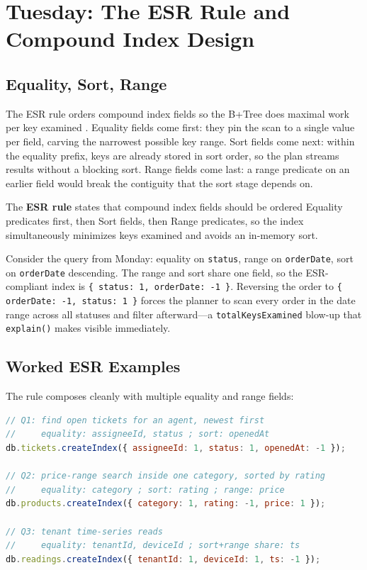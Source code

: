 \section{Tuesday: The ESR Rule and Compound Index Design}
\subsection{Equality, Sort, Range}
The ESR rule orders compound index fields so the B+Tree does maximal work per key examined \cite{mongodbESRDocs}. Equality fields come first: they pin the scan to a single value per field, carving the narrowest possible key range. Sort fields come next: within the equality prefix, keys are already stored in sort order, so the plan streams results without a blocking sort. Range fields come last: a range predicate on an earlier field would break the contiguity that the sort stage depends on.

\begin{definitionbox}
The \textbf{ESR rule} states that compound index fields should be ordered Equality predicates first, then Sort fields, then Range predicates, so the index simultaneously minimizes keys examined and avoids an in-memory sort.
\end{definitionbox}

Consider the query from Monday: equality on \texttt{status}, range on \texttt{orderDate}, sort on \texttt{orderDate} descending. The range and sort share one field, so the ESR-compliant index is \texttt{\{ status: 1, orderDate: -1 \}}. Reversing the order to \texttt{\{ orderDate: -1, status: 1 \}} forces the planner to scan every order in the date range across all statuses and filter afterward---a \texttt{totalKeysExamined} blow-up that \texttt{explain()} makes visible immediately.

\subsection{Worked ESR Examples}
The rule composes cleanly with multiple equality and range fields:

\begin{lstlisting}[language=JavaScript, caption={ESR design for three real query shapes.}]
// Q1: find open tickets for an agent, newest first
//     equality: assigneeId, status ; sort: openedAt
db.tickets.createIndex({ assigneeId: 1, status: 1, openedAt: -1 });

// Q2: price-range search inside one category, sorted by rating
//     equality: category ; sort: rating ; range: price
db.products.createIndex({ category: 1, rating: -1, price: 1 });

// Q3: tenant time-series reads
//     equality: tenantId, deviceId ; sort+range share: ts
db.readings.createIndex({ tenantId: 1, deviceId: 1, ts: -1 });
\end{lstlisting}

